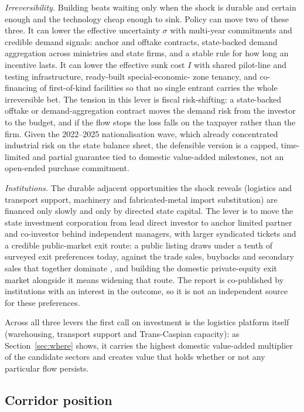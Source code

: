 \documentclass[12pt]{article}
\begin{document}
\emph{Irreversibility.} Building beats waiting only when the shock is durable and certain
enough and the technology cheap enough to sink. Policy can move two of these three. It can
lower the effective uncertainty $\sigma$ with multi-year commitments and credible demand
signals: anchor and offtake contracts, state-backed demand aggregation across ministries and
state firms, and a stable rule for how long an incentive lasts. It can lower the effective
sunk cost $I$ with shared pilot-line and testing infrastructure, ready-built special-economic-%
zone tenancy, and co-financing of first-of-kind facilities so that no single entrant carries
the whole irreversible bet. The tension in this lever is fiscal risk-shifting: a state-backed
offtake or demand-aggregation contract moves the demand risk from the investor to the budget,
and if the flow stops the loss falls on the taxpayer rather than the firm. Given the
2022--2025 nationalisation wave, which already concentrated industrial risk on the state
balance sheet, the defensible version is a capped, time-limited and partial guarantee tied to
domestic value-added milestones, not an open-ended purchase commitment.

\emph{Institutions.} The durable adjacent opportunities the shock reveals (logistics and
transport support, machinery and fabricated-metal import substitution) are financed only
slowly and only by directed state capital. The lever is to move the state investment
corporation from lead direct investor to anchor limited partner and co-investor behind
independent managers, with larger syndicated tickets and a credible public-market exit route:
a public listing draws under a tenth of surveyed exit preferences today, against the trade
sales, buybacks and secondary sales that together dominate \citep{qicaifcifc2026pe}, and
building the domestic private-equity exit market alongside it means widening that route. The report is co-published by institutions with an interest in the outcome, so it is not an independent source for these preferences.

Across all three levers the first call on investment is the logistics platform itself
(warehousing, transport support and Trans-Caspian capacity): as Section~\ref{sec:where} shows,
it carries the highest domestic value-added multiplier of the candidate sectors and creates
value that holds whether or not any particular flow persists.

\subsection{Corridor position}
\end{document}

